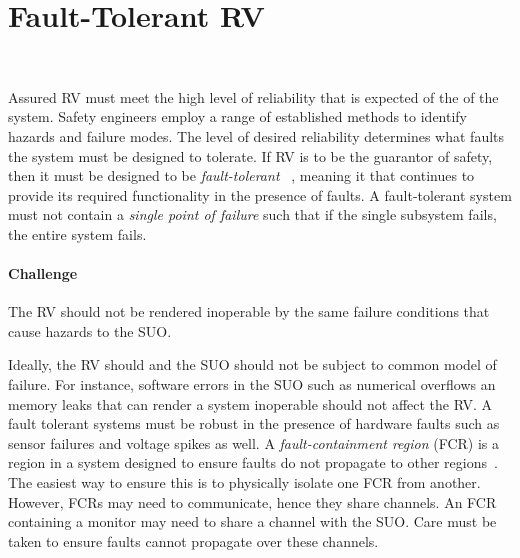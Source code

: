 \section{Fault-Tolerant RV}~\label{sec:ft}

 
Assured RV must meet the high level of reliability that is expected of
the of the system. Safety engineers employ a range of established
methods to identify hazards and failure modes. The level of desired
reliability determines what faults the system must be designed to
tolerate. If RV is to be the guarantor of safety, then it must be
designed to be \emph{fault-tolerant} ~\cite{butler-faults}, meaning it
that continues to provide its required functionality in the presence
of faults.  A fault-tolerant system must not contain a \emph{single
  point of failure} such that if the single subsystem fails, the
entire system fails.

\paragraph{Challenge}   The RV  should not be rendered inoperable by the
 same failure conditions that cause hazards to the SUO. 

 Ideally, the RV should and the SUO should not be subject to common
 model of failure.  For instance, software errors in the SUO such as
 numerical overflows an memory leaks that can render a system
 inoperable should not affect the RV.  A fault tolerant systems must
 be robust in the presence of hardware faults such as sensor failures
 and voltage spikes as well.  A \emph{fault-containment region} (FCR)
 is a region in a system designed to ensure faults do not propagate to
 other regions~\cite{Rushby01:buscompare}.   The
 easiest way to ensure this is to physically isolate one FCR from
 another.  However, FCRs may need to communicate, hence they share
 channels. An FCR containing a monitor may need to share a channel
 with the SUO.  Care must be taken to ensure faults cannot propagate
 over these channels.



